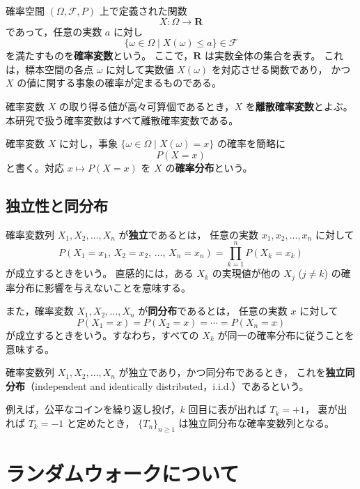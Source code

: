 \documentclass[a4j,dvipdfmx]{jsarticle}
\theoremstyle{plainnote}
\begin{document}
確率空間 $(\Omega,\mathcal{F},P)$ 上で定義された関数
\[
  X:\Omega \longrightarrow \mathbf{R}
\]
であって，任意の実数 $a$ に対し
\[
  \{\omega \in \Omega \mid X(\omega)\leq a\} \in \mathcal{F}
\]
を満たすものを\textbf{確率変数}という。
ここで，$\mathbf{R}$ は実数全体の集合を表す。
これは，標本空間の各点 $\omega$ に対して実数値 $X(\omega)$ を対応させる関数であり，
かつ $X$ の値に関する事象の確率が定まるものである。

確率変数 $X$ の取り得る値が高々可算個であるとき，$X$ を\textbf{離散確率変数}とよぶ。
本研究で扱う確率変数はすべて離散確率変数である。

確率変数 $X$ に対し，事象 $\{\omega\in\Omega\mid X(\omega)=x\}$ の確率を簡略に
\[
  P(X=x)
\]
と書く。対応 $x \mapsto P(X=x)$ を $X$ の\textbf{確率分布}という。
\subsection{独立性と同分布}\label{subsec:iid}

確率変数列 $X_1,X_2,\ldots,X_n$ が\textbf{独立}であるとは，
任意の実数 $x_1,x_2,\ldots,x_n$ に対して
\begin{equation}
  P(X_1=x_1,\,X_2=x_2,\,\ldots,\,X_n=x_n)
  =\prod_{k=1}^{n} P(X_k=x_k)
  \label{eq:independence}
\end{equation}
が成立するときをいう。
直感的には，ある $X_k$ の実現値が他の $X_j$ ($j\neq k$) の確率分布に影響を与えないことを意味する。

また，確率変数 $X_1,X_2,\ldots,X_n$ が\textbf{同分布}であるとは，
任意の実数 $x$ に対して
\begin{equation}
  P(X_1=x)=P(X_2=x)=\cdots=P(X_n=x)
  \label{eq:identical}
\end{equation}
が成立するときをいう。すなわち，すべての $X_k$ が同一の確率分布に従うことを意味する。

確率変数列 $X_1,X_2,\ldots,X_n$ が独立であり，かつ同分布であるとき，
これを\textbf{独立同分布}（independent and identically distributed，i.i.d.）であるという。

例えば，公平なコインを繰り返し投げ，$k$ 回目に表が出れば $T_k=+1$，
裏が出れば $T_k=-1$ と定めたとき，
$\{T_n\}_{n\geq 1}$ は独立同分布な確率変数列となる。





\newpage
\section{ランダムウォークについて}
\end{document}
